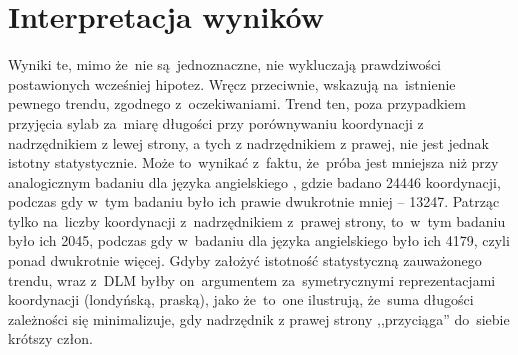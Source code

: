 \documentclass[licencjacka]{pracamgr_Kogni}
\begin{document}
    \section{Interpretacja wyników}\label{sec:interpretacja-wynikow}
    Wyniki te, mimo że~nie są~jednoznaczne, nie wykluczają prawdziwości postawionych wcześniej hipotez.
    Wręcz przeciwnie, wskazują na~istnienie pewnego trendu, zgodnego z~oczekiwaniami.
    Trend ten, poza przypadkiem przyjęcia sylab za~miarę długości przy porównywaniu koordynacji z nadrzędnikiem z lewej strony, a tych z nadrzędnikiem z prawej, nie jest jednak istotny statystycznie.
    Może to~wynikać z~faktu, że~próba jest mniejsza niż przy analogicznym badaniu dla języka angielskiego \citep{Przepiorkowski2023}, gdzie badano 24446 koordynacji, podczas gdy w~tym badaniu było ich prawie dwukrotnie mniej -- 13247.
    Patrząc tylko na~liczby koordynacji z~nadrzędnikiem z~prawej strony, to~w~tym badaniu było ich 2045, podczas gdy w~badaniu dla języka angielskiego było ich 4179, czyli ponad dwukrotnie więcej.
    Gdyby założyć istotność statystyczną zauważonego trendu, wraz z~DLM byłby on~argumentem za~symetrycznymi reprezentacjami koordynacji (londyńską, praską), jako że~to~one ilustrują, że~suma długości zależności się minimalizuje, gdy nadrzędnik z prawej strony ,,przyciąga'' do~siebie krótszy człon.
\end{document}
